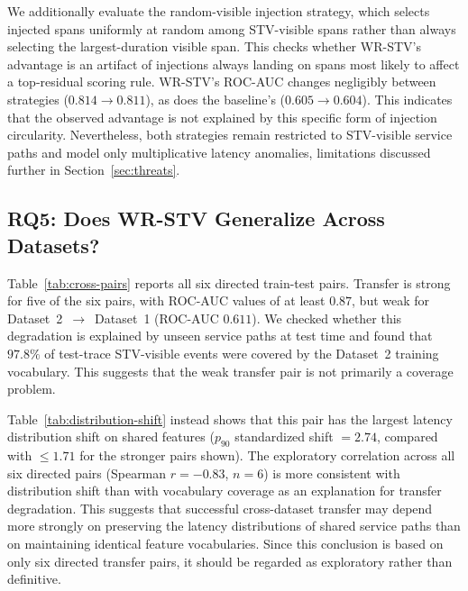 We additionally evaluate the random-visible injection strategy, which
selects injected spans uniformly at random among STV-visible spans rather
than always selecting the largest-duration visible span. This checks
whether WR-STV's advantage is an artifact of injections always landing
on spans most likely to affect a top-residual scoring rule. WR-STV's
ROC-AUC changes negligibly between strategies
(\(0.814 \rightarrow 0.811\)), as does the baseline's
(\(0.605 \rightarrow 0.604\)). This indicates that the observed
advantage is not explained by this specific form of injection
circularity. Nevertheless, both strategies remain restricted to
STV-visible service paths and model only multiplicative latency
anomalies, limitations discussed further in Section~\ref{sec:threats}.

\subsection{RQ5: Does WR-STV Generalize Across Datasets?}


Table~\ref{tab:cross-pairs} reports all six directed train-test pairs.
Transfer is strong for five of the six pairs, with ROC-AUC values of at
least \(0.87\), but weak for Dataset~2~\(\rightarrow\)~Dataset~1
(ROC-AUC \(0.611\)). We checked whether this degradation is explained by
unseen service paths at test time and found that \(97.8\%\) of
test-trace STV-visible events were covered by the Dataset~2 training
vocabulary. This suggests that the weak transfer pair is not primarily a
coverage problem.


Table~\ref{tab:distribution-shift} instead shows that this pair has the
largest latency distribution shift on shared features
(\(p_{90}\) standardized shift \(=2.74\), compared with
\(\leq 1.71\) for the stronger pairs shown). The exploratory correlation
across all six directed pairs (Spearman \(r=-0.83\), \(n=6\)) is more
consistent with distribution shift than with vocabulary coverage as an
explanation for transfer degradation. This suggests that successful
cross-dataset transfer may depend more strongly on preserving the
latency distributions of shared service paths than on maintaining
identical feature vocabularies. Since this conclusion is based on only
six directed transfer pairs, it should be regarded as exploratory rather
than definitive.

